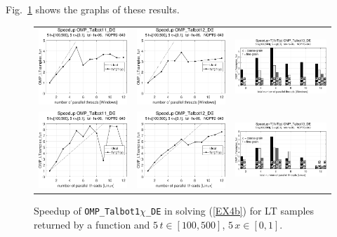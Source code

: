\documentclass[a4paper,10pt]{report}%
\begin{document}
Fig.~\ref{PAR_EX4b_speedup_fun} shows the graphs of these results.
\begin{figure}[htb]
\centering
\begin{tabular}{ccc} %
\includegraphics[height=0.2\textwidth]{./FIGS/EX4b/EX4b_fun_speedup_11_5t_100_Windows.eps} &
\includegraphics[height=0.2\textwidth]{./FIGS/EX4b/EX4b_fun_speedup_12_5t_100_Windows.eps} &
\includegraphics[height=0.2\textwidth,keepaspectratio=true]{./FIGS/EX4b/EX4b_fun_speedup_13_5t_100_Windows.eps} \\
\includegraphics[height=0.2\textwidth]{./FIGS/EX4b/EX4b_fun_speedup_11_5t_100_Linux.eps} &
\includegraphics[height=0.2\textwidth]{./FIGS/EX4b/EX4b_fun_speedup_12_5t_100_Linux.eps} &
\includegraphics[height=0.2\textwidth,keepaspectratio=true]{./FIGS/EX4b/EX4b_fun_speedup_13_5t_100_Linux.eps}
\end{tabular}
\caption{\small Speedup of {\tt OMP\_Talbot1$\chi$\_DE} in solving (\ref{EX4b}) for LT samples
returned by a function and $5\,t\in[100,500]$, $5\,x\in[0,1]$.}
\label{PAR_EX4b_speedup_fun}
\end{figure}
\end{document}
